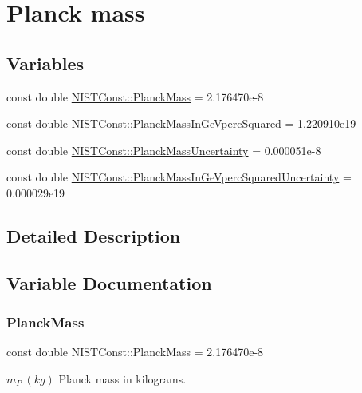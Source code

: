 \hypertarget{group___planck_mass}{}\section{Planck mass}
\label{group___planck_mass}
\subsection*{Variables}
\begin{DoxyCompactItemize}
\item 
const double \hyperlink{group___planck_mass_ga8699da3ffe64687b76fb5f262a63997f}{N\+I\+S\+T\+Const\+::\+Planck\+Mass} = 2.\+176470e-\/8
\item 
const double \hyperlink{group___planck_mass_ga71709062f673aeed0bed395299d84a68}{N\+I\+S\+T\+Const\+::\+Planck\+Mass\+In\+Ge\+Vperc\+Squared} = 1.\+220910e19
\item 
const double \hyperlink{group___planck_mass_ga500eef372db7d6dcddd4a4a2d3e03b00}{N\+I\+S\+T\+Const\+::\+Planck\+Mass\+Uncertainty} = 0.\+000051e-\/8
\item 
const double \hyperlink{group___planck_mass_gaab9eed84a649fb1ee6e90b2e15c86b0a}{N\+I\+S\+T\+Const\+::\+Planck\+Mass\+In\+Ge\+Vperc\+Squared\+Uncertainty} = 0.\+000029e19
\end{DoxyCompactItemize}


\subsection{Detailed Description}


\subsection{Variable Documentation}
\mbox{\label{group___planck_mass_ga8699da3ffe64687b76fb5f262a63997f}} 
\subsubsection{\texorpdfstring{Planck\+Mass}{PlanckMass}}
{\footnotesize\ttfamily const double N\+I\+S\+T\+Const\+::\+Planck\+Mass = 2.\+176470e-\/8}

$m_P \ (kg)$ Planck mass in kilograms. \mbox{\label{group___planck_mass_ga71709062f673aeed0bed395299d84a68}} 
